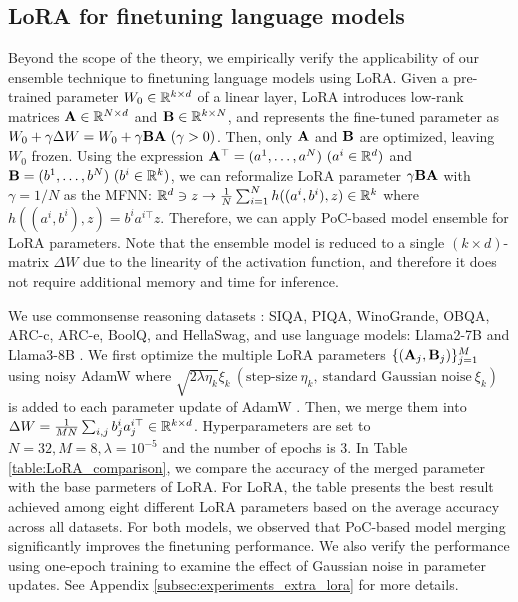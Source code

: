 \subsection{LoRA for finetuning language models}
Beyond the scope of the theory, we empirically verify the applicability of our ensemble technique to finetuning language models using LoRA. Given a pre-trained parameter $W_0 \in \mathbb{R}^{k\times d}$ of a linear layer, LoRA introduces low-rank matrices $\mathbf{A} \in \mathbb{R}^{N\times d}$ and $\mathbf{B} \in \mathbb{R}^{k\times N}$, and represents the fine-tuned parameter as $W_0 + \gamma \Delta W = W_0 + \gamma \mathbf{B}\mathbf{A}~(\gamma > 0)$. Then, only $\mathbf{A}$ and $\mathbf{B}$ are optimized, leaving $W_0$ frozen. Using the expression $\mathbf{A}^\top = (a^1,\ldots,a^N)~(a^i \in \mathbb{R}^d)$ and $\mathbf{B}=(b^1,\ldots,b^N)~(b^i \in \mathbb{R}^k)$, we can reformalize LoRA parameter $\gamma\mathbf{B}\mathbf{A}$ with $\gamma=1/N$ as the MFNN: $\mathbb{R}^d \ni z \to \frac{1}{N}\sum_{i=1}^N h((a^i,b^i),z) \in \mathbb{R}^k$ where $h((a^i,b^i),z) = b^ia^{i\top} z$. Therefore, we can apply PoC-based model ensemble for LoRA parameters. Note that the ensemble model is reduced to a single $(k\times d)$-matrix $\Delta W$ due to the linearity of the activation function, and therefore it does not require additional memory and time for inference. 

We use commonsense reasoning datasets \cite{hu2023llm}: SIQA, PIQA, WinoGrande, OBQA, ARC-c, ARC-e, BoolQ, and HellaSwag, and use language models: Llama2-7B \cite{touvron2023llama} and Llama3-8B \cite{dubey2024llama}. We first optimize the multiple LoRA parameters $\{(\mathbf{A}_j,\mathbf{B}_j)\}_{j=1}^M$ using noisy AdamW where $\sqrt{2 \lambda \eta_k} \xi_k~(\textrm{step-size}~\eta_k,~\textrm{standard Gaussian noise}~\xi_k)$ is added to each parameter update of AdamW \cite{loshchilovdecoupled}. Then, we merge them into $\Delta W = \frac{1}{MN}\sum_{i,j}b^i_j a^{i\top}_j\in \mathbb{R}^{k\times d}$. Hyperparameters are set to $N=32, M=8, \lambda=10^{-5}$ and the number of epochs is $3$. In Table \ref{table:LoRA_comparison}, we compare the accuracy of the merged parameter with the base parmeters of LoRA. For LoRA, the table presents the best result achieved among eight different LoRA parameters based on the average accuracy across all datasets. For both models, we observed that PoC-based model merging significantly improves the finetuning performance. We also verify the performance using one-epoch training to examine the effect of Gaussian noise in parameter updates. See Appendix \ref{subsec:experiments_extra_lora} for more details.
